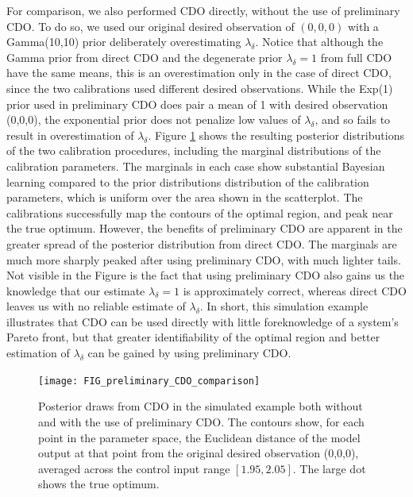 \documentclass[12pt]{article}
\begin{document}
%
For comparison, we also performed CDO directly, without the use of preliminary CDO.
%
To do so, we used our original desired observation of $(0,0,0)$ with a Gamma(10,10) prior deliberately overestimating $\lambda_\delta$.
%
Notice that although the Gamma prior from direct CDO and the degenerate prior $\lambda_\delta=1$ from full CDO have the same means, this is an overestimation only in the case of direct CDO, since the two calibrations used different desired observations.
%
While the Exp(1) prior used in preliminary CDO does pair a mean of 1 with desired observation (0,0,0), the exponential prior does not penalize low values of $\lambda_\delta$, and so fails to result in overestimation of $\lambda_\delta$.
%
Figure \ref{fig:toy_sim_results} shows the resulting posterior distributions of the two calibration procedures, including the marginal distributions of the calibration parameters. 
%
The marginals in each case show substantial Bayesian learning compared to the prior distributions distribution of the calibration parameters, which is uniform over the area shown in the scatterplot. 
%
The calibrations successfully map the contours of the optimal region, and peak near the true optimum. 
%
However, the benefits of preliminary CDO are apparent in the greater spread of the posterior distribution from direct CDO.
%
The marginals are much more sharply peaked after using preliminary CDO, with much lighter tails.
%
Not visible in the Figure is the fact that using preliminary CDO also gains us the knowledge that our estimate $\lambda_\delta=1$ is approximately correct, whereas direct CDO leaves us with no reliable estimate of $\lambda_\delta$.
%
In short, this simulation example illustrates that CDO can be used directly with little foreknowledge of a system's Pareto front, but that greater identifiability of the optimal region and better estimation of $\lambda_\delta$ can be gained by using preliminary CDO.

\begin{figure}
\centering
\texttt{[image: FIG\_preliminary\_CDO\_comparison]}
\caption{Posterior draws from CDO in the simulated example both without and with the use of preliminary CDO. The contours show, for each point in the parameter space, the Euclidean distance of the model output at that point from the original desired observation (0,0,0), averaged across the control input range $[1.95,2.05]$. The large dot shows the true optimum.}
\label{fig:toy_sim_results}
\end{figure}
\end{document}
